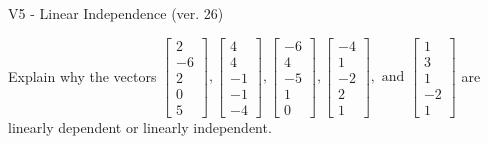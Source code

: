 \begin{exercise}
  \begin{exerciseTitle}V5 - Linear Independence (ver. 26)\end{exerciseTitle}
  \begin{exerciseStatement}
    Explain why the vectors \(\left[\begin{array}{r}
2 \\
-6 \\
2 \\
0 \\
5
\end{array}\right] , \left[\begin{array}{r}
4 \\
4 \\
-1 \\
-1 \\
-4
\end{array}\right] , \left[\begin{array}{r}
-6 \\
4 \\
-5 \\
1 \\
0
\end{array}\right] , \left[\begin{array}{r}
-4 \\
1 \\
-2 \\
2 \\
1
\end{array}\right] , \text{ and } \left[\begin{array}{r}
1 \\
3 \\
1 \\
-2 \\
1
\end{array}\right]\) are linearly dependent or linearly independent.	



\end{exerciseStatement}
\end{exercise}
